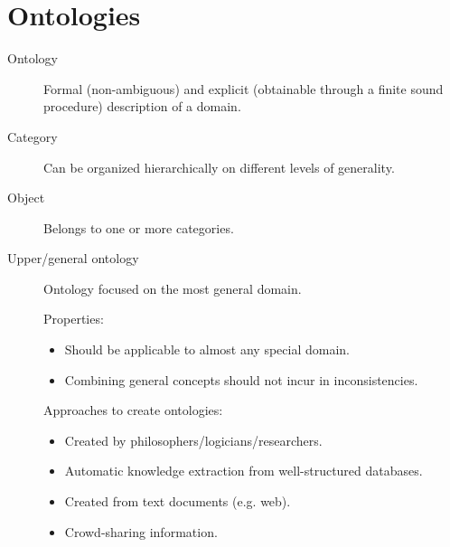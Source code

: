 \chapter{Ontologies}

\begin{description}
    \item[Ontology]  
        Formal (non-ambiguous) and explicit (obtainable through a finite sound procedure) 
        description of a domain.

    \item[Category] 
        Can be organized hierarchically on different levels of generality.

    \item[Object] 
        Belongs to one or more categories.

    \item[Upper/general ontology]  
        Ontology focused on the most general domain.

        Properties:
        \begin{itemize}
            \item Should be applicable to almost any special domain.
            \item Combining general concepts should not incur in inconsistencies.
        \end{itemize}

        Approaches to create ontologies:
        \begin{itemize}
            \item Created by philosophers/logicians/researchers.
            \item Automatic knowledge extraction from well-structured databases.
            \item Created from text documents (e.g. web).
            \item Crowd-sharing information.
        \end{itemize}
\end{description}


